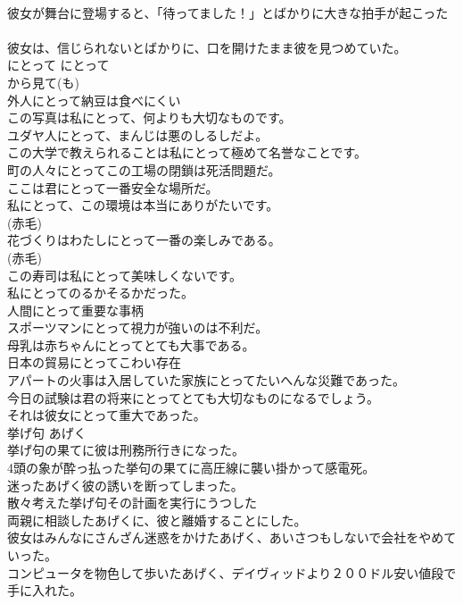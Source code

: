 \documentclass[8pt]{extreport}
\begin{document}
\begin{CJK}{UTF8}{min}
\\	彼女が舞台に登場すると、「待ってました！」とばかりに大きな拍手が起こった   
\\	彼女は、信じられないとばかりに、口を開けたまま彼を見つめていた。   
\\	にとって	にとって	
\\	から見て(も)	
\\	外人にとって納豆は食べにくい  
\\	この写真は私にとって、何よりも大切なものです。  
\\	ユダヤ人にとって、まんじは悪のしるしだよ。  
\\	この大学で教えられることは私にとって極めて名誉なことです。   
\\	町の人々にとってこの工場の閉鎖は死活問題だ。   
\\	ここは君にとって一番安全な場所だ。  
\\	私にとって、この環境は本当にありがたいです。  
\\	(赤毛)
\\	花づくりはわたしにとって一番の楽しみである。  
\\	(赤毛)
\\	この寿司は私にとって美味しくないです。   
\\	私にとってのるかそるかだった。  
\\	人間にとって重要な事柄   
\\	スポーツマンにとって視力が強いのは不利だ。   
\\	母乳は赤ちゃんにとってとても大事である。   
\\	日本の貿易にとってこわい存在  
\\	アパートの火事は入居していた家族にとってたいへんな災難であった。   
\\	今日の試験は君の将来にとってとても大切なものになるでしょう。   
\\	それは彼女にとって重大であった。   
\\	挙げ句	あげく	
\\	挙げ句の果てに彼は刑務所行きになった。  
\\	4頭の象が酔っ払った挙句の果てに高圧線に襲い掛かって感電死。  
\\	迷ったあげく彼の誘いを断ってしまった。  
\\	散々考えた挙げ句その計画を実行にうつした  
\\	両親に相談したあげくに、彼と離婚することにした。   
\\	彼女はみんなにさんざん迷惑をかけたあげく、あいさつもしないで会社をやめていった。  
\\	コンピュータを物色して歩いたあげく、デイヴィッドより２００ドル安い値段で手に入れた。  

\end{CJK}
\end{document}
